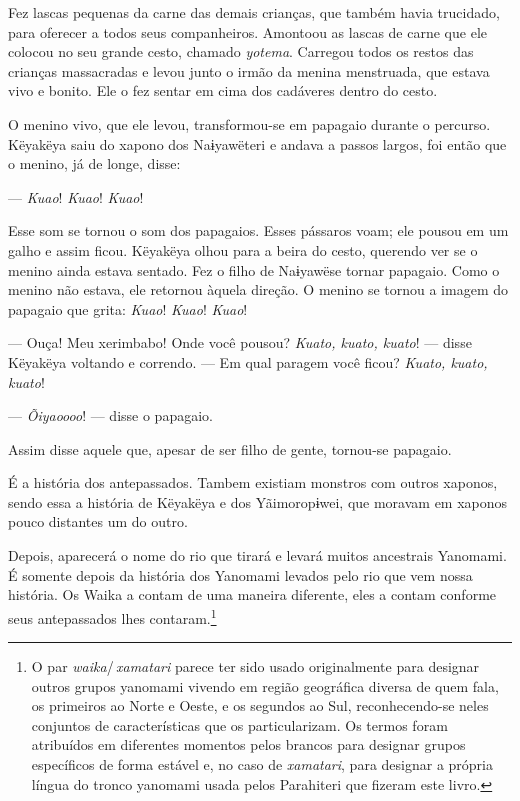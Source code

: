 Fez lascas pequenas da carne das demais crianças, que também havia
trucidado, para oferecer a todos seus companheiros. Amontoou as lascas de
carne que ele colocou no seu grande cesto, chamado \textit{yotema}.
Carregou todos os restos das crianças massacradas e levou junto o irmão
da menina menstruada, que estava vivo e bonito. Ele o fez sentar em cima
dos cadáveres dentro do cesto. 

O menino vivo, que ele levou, transformou-se em papagaio durante o
percurso. Këyakëya saiu do xapono dos Naɨyawëteri e andava a passos
largos, foi então que o menino, já de longe, disse: 

--- \textit{Kuao}! \textit{Kuao}! \textit{Kuao}!

Esse som se tornou o som dos papagaios. Esses pássaros voam; ele pousou
em um galho e assim ficou. Këyakëya olhou para a beira do cesto,
querendo ver se o menino ainda estava sentado. Fez o filho de Naɨyawëse
tornar papagaio. Como o menino não estava, ele retornou àquela direção.
O menino se tornou a imagem do papagaio que grita: \textit{Kuao}! \textit{Kuao}!
\textit{Kuao}!

--- Ouça! Meu xerimbabo! Onde você pousou? \textit{Kuato, kuato, kuato}! ---
disse Këyakëya voltando e correndo. --- Em qual paragem você
ficou? \textit{Kuato, kuato, kuato}!

--- \textit{Õiyaoooo}! --- disse o papagaio. 

Assim disse aquele que, apesar de ser filho de gente, tornou-se
papagaio. 

É a história dos antepassados. Tambem existiam monstros com outros
xaponos, sendo essa a história de Këyakëya e dos Yãimoropɨwei, que
moravam em xaponos pouco distantes um do outro. 

Depois, aparecerá o nome do rio que tirará e levará muitos ancestrais
Yanomami. É somente depois da história dos Yanomami levados pelo rio que
vem nossa história. Os Waika a contam de uma maneira diferente, eles a
contam conforme seus antepassados lhes contaram.\footnote{O par \textit{waika}/\,\textit{xamatari} parece ter sido usado originalmente para designar outros grupos yanomami vivendo em região geográfica diversa de quem fala, os primeiros ao Norte e Oeste, e os segundos ao Sul, reconhecendo-se neles conjuntos de características que os particularizam. Os termos foram atribuídos em diferentes momentos pelos brancos para designar grupos específicos de forma estável e, no caso de \textit{xamatari}, para designar a própria língua do tronco yanomami usada pelos Parahiteri que fizeram este livro.} 

